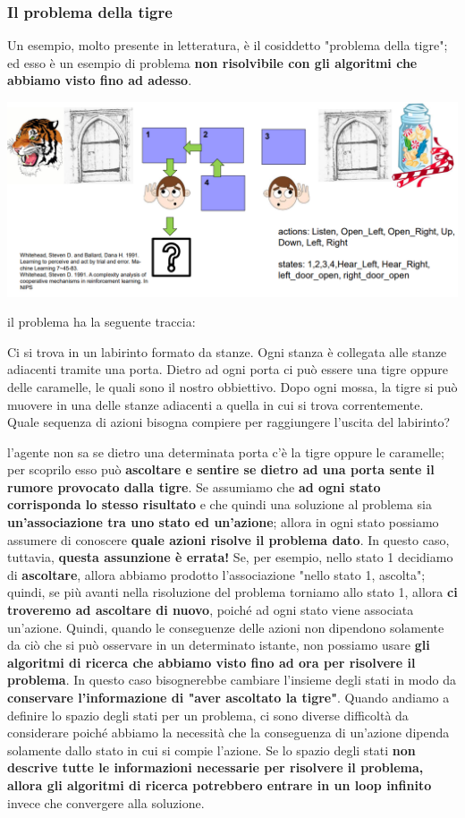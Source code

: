 \documentclass[12pt]{article}
\begin{document}
\subsubsection{Il problema della tigre}
Un esempio, molto presente in letteratura, è il cosiddetto "problema della tigre";
ed esso è un esempio di problema \textbf{non risolvibile con gli algoritmi che abbiamo visto fino ad adesso}.
\begin{center}
    \includegraphics[width = 1\linewidth]{Images/35.PNG}
\end{center}
il problema ha la seguente traccia:
\begin{center}
    Ci si trova in un labirinto formato da stanze. Ogni stanza è collegata alle stanze adiacenti tramite una porta.
    Dietro ad ogni porta ci può essere una tigre oppure delle caramelle, le quali sono il nostro obbiettivo.
    Dopo ogni mossa, la tigre si può muovere in una delle stanze adiacenti a quella in cui si trova correntemente.
    Quale sequenza di azioni bisogna compiere per raggiungere l'uscita del labirinto?
\end{center}
l'agente non sa se dietro una determinata porta c'è la tigre oppure le caramelle; per scoprilo esso può \textbf{ascoltare e sentire se dietro ad una porta sente il rumore provocato dalla tigre}.
Se assumiamo che \textbf{ad ogni stato corrisponda lo stesso risultato} e che quindi una soluzione al problema sia \textbf{un'associazione tra uno stato ed un'azione}; allora in ogni stato possiamo assumere
di conoscere \textbf{quale azioni risolve il problema dato}. In questo caso, tuttavia, \textbf{questa assunzione è errata!} Se, per esempio, nello stato 1 decidiamo di \textbf{ascoltare}, allora abbiamo prodotto
l'associazione "nello stato 1, ascolta"; quindi, se più avanti nella risoluzione del problema torniamo allo stato 1, allora \textbf{ci troveremo ad ascoltare di nuovo}, poiché ad ogni stato viene associata un'azione.
Quindi, quando le conseguenze delle azioni non dipendono solamente da ciò che si può osservare in un determinato istante, non possiamo usare \textbf{gli algoritmi di ricerca che abbiamo visto fino ad ora per risolvere il problema}.
In questo caso bisognerebbe cambiare l'insieme degli stati in modo da \textbf{conservare l'informazione di "aver ascoltato la tigre"}.
Quando andiamo a definire lo spazio degli stati per un problema, ci sono diverse difficoltà da considerare poiché abbiamo la necessità 
che la conseguenza di un'azione dipenda solamente dallo stato in cui si compie l'azione.
Se lo spazio degli stati \textbf{non descrive tutte le informazioni necessarie per risolvere il problema, allora gli algoritmi di ricerca potrebbero entrare in un loop infinito} invece
che convergere alla soluzione.
\end{document}
